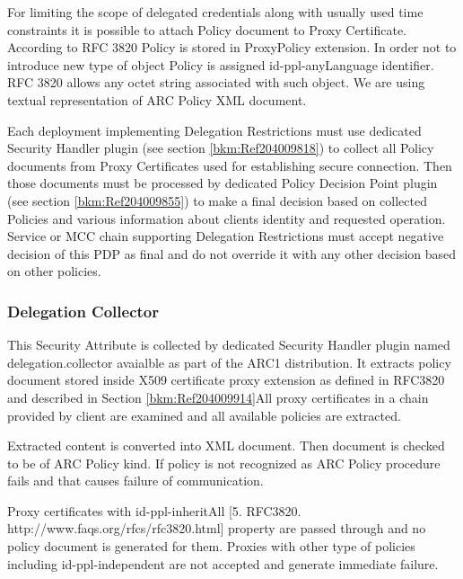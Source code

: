 \documentclass[a4paper]{article}
\begin{document}
{\upshape\color{black}
For limiting the scope of delegated credentials along with usually used
time constraints it is possible to attach Policy document to Proxy
Certificate. According to RFC 3820 Policy is stored in ProxyPolicy
extension. In order not to introduce new type of object Policy is
assigned id-ppl-anyLanguage identifier. RFC 3820 allows any octet
string associated with such object. We are using textual representation
of ARC Policy XML document.}

{\upshape\color{black}
Each deployment implementing Delegation Restrictions must use dedicated
Security Handler plugin (see section \ref{bkm:Ref204009818}) to collect
all Policy documents from Proxy Certificates used for establishing
secure connection. Then those documents must be processed by dedicated
Policy Decision Point plugin (see section \ref{bkm:Ref204009855}) to
make a final decision based on collected Policies and various
information about client{\textquotesingle}s identity and requested
operation. Service or MCC chain supporting Delegation Restrictions must
accept negative decision of this PDP as final and do not override it
with any other decision based on other policies.}

\subsubsection[Delegation Collector]{Delegation Collector}
\label{bkm:Ref204009734}{\upshape\color{black}
This Security Attribute is collected by dedicated Security Handler
plugin named {\textquotedbl}delegation.collector{\textquotedbl}
avaialble as part of the ARC1 distribution. It extracts policy document
stored inside X509 certificate proxy extension as defined in RFC3820
and described in Section \ref{bkm:Ref204009914}All proxy certificates
in a chain provided by client are examined and all available policies
are extracted. }

{\upshape\color{black}
Extracted content is converted into XML document. Then document is
checked to be of ARC Policy kind. If policy is not recognized as ARC
Policy procedure fails and that causes failure of communication.}

{\upshape\color{black}
Proxy certificates with id-ppl-inheritAll [5. RFC3820.
http://www.faqs.org/rfcs/rfc3820.html] property are passed through and
no policy document is generated for them. Proxies with other type of
policies including id-ppl-independent are not accepted and generate
immediate failure.}
\end{document}
